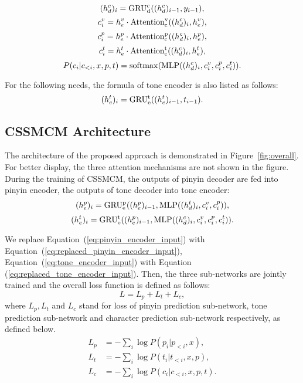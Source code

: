\documentclass[sigconf]{acmart}
\begin{document}
\begin{equation}
(h^c_d)_i = {\rm GRU^c_d}((h^c_d)_{i-1}, y_{i-1}),
\end{equation} 
\begin{equation}
c^v_i = h^v_e \cdot {\rm Attention^v_c}((h^c_d)_i, h^v_e),
\end{equation}
\begin{equation}
c^p_i = h^p_e \cdot {\rm Attention^p_c}((h^c_d)_i, h^p_e),
\end{equation}
\begin{equation}
c^t_i = h^t_e \cdot {\rm Attention^t_c}((h^c_d)_i, h^t_e),
\end{equation}
\begin{equation}
P(c_i|c_{<i}, x, p, t) = {\rm softmax}({\rm MLP}((h^c_d)_i, c^v_i, c^p_i, c^t_i)).
\end{equation}

For the following needs, the formula of tone encoder is also listed as follows:
\begin{equation}\label{eq:tone_encoder_input}
(h^t_e)_i = {\rm GRU^t_e}((h^t_e)_{i-1}, t_{i-1}).
\end{equation}

\subsection{CSSMCM Architecture}
The architecture of the proposed approach is demonstrated in Figure~\ref{fig:overall}. For better display, the three attention mechanisms are not shown in the figure. During the training of CSSMCM, the outputs of pinyin decoder are fed into pinyin encoder, the outputs of tone decoder into tone encoder:
\begin{equation}\label{eq:replaced_pinyin_encoder_input}
(h^p_e)_i = {\rm GRU^p_e}((h^p_e)_{i-1}, {\rm MLP}((h^t_d)_i, c^v_i, c^p_i)),
\end{equation}
\begin{equation}\label{eq:replaced_tone_encoder_input}
(h^t_e)_i = {\rm GRU^t_e}((h^p_e)_{i-1}, {\rm MLP}((h^c_d)_i, c^v_i, c^p_i, c^t_i)).
\end{equation}

We replace Equation~(\ref{eq:pinyin_encoder_input}) with Equation~(\ref{eq:replaced_pinyin_encoder_input}), Equation~(\ref{eq:tone_encoder_input}) with Equation (\ref{eq:replaced_tone_encoder_input}). Then, the three sub-networks are jointly trained and the overall loss function is defined as follows:
\begin{equation}
L = L_p + L_t + L_c,
\end{equation}
where $L_p, L_t$ and $L_c$ stand for loss of pinyin prediction sub-network, tone prediction sub-network and character prediction sub-network respectively, as defined below.
\begin{equation}
\begin{split}
    L_p &= - \sum_i \log P(p_i|p_{<{i}}, x),\\
    L_t &= - \sum_i \log P(t_i|t_{<i}, x, p),\\
    L_c &= - \sum_i \log P(c_i|c_{<i}, x, p, t). \\
\end{split}
\end{equation}
\end{document}
